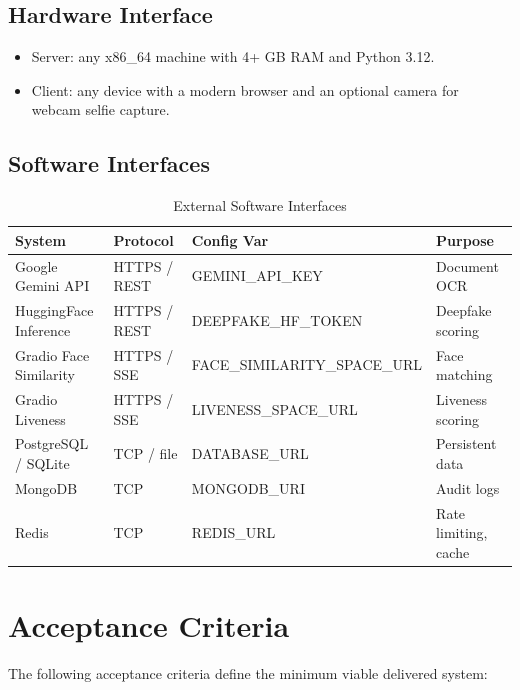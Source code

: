 \documentclass[12pt,a4paper]{report}
\begin{document}
\subsection{Hardware Interface}
\begin{itemize}
    \item Server: any x86\_64 machine with 4+ GB RAM and Python 3.12.
    \item Client: any device with a modern browser and an optional camera for webcam selfie capture.
\end{itemize}

\subsection{Software Interfaces}
\begin{table}[H]
\centering
\caption{External Software Interfaces}
\begin{tabular}{@{}llll@{}}
\toprule
\textbf{System} & \textbf{Protocol} & \textbf{Config Var} & \textbf{Purpose} \\
\midrule
Google Gemini API & HTTPS / REST & GEMINI\_API\_KEY & Document OCR \\
HuggingFace Inference & HTTPS / REST & DEEPFAKE\_HF\_TOKEN & Deepfake scoring \\
Gradio Face Similarity & HTTPS / SSE & FACE\_SIMILARITY\_SPACE\_URL & Face matching \\
Gradio Liveness & HTTPS / SSE & LIVENESS\_SPACE\_URL & Liveness scoring \\
PostgreSQL / SQLite & TCP / file & DATABASE\_URL & Persistent data \\
MongoDB & TCP & MONGODB\_URI & Audit logs \\
Redis & TCP & REDIS\_URL & Rate limiting, cache \\
\bottomrule
\end{tabular}
\end{table}

\section{Acceptance Criteria}

The following acceptance criteria define the minimum viable delivered system:
\end{document}
